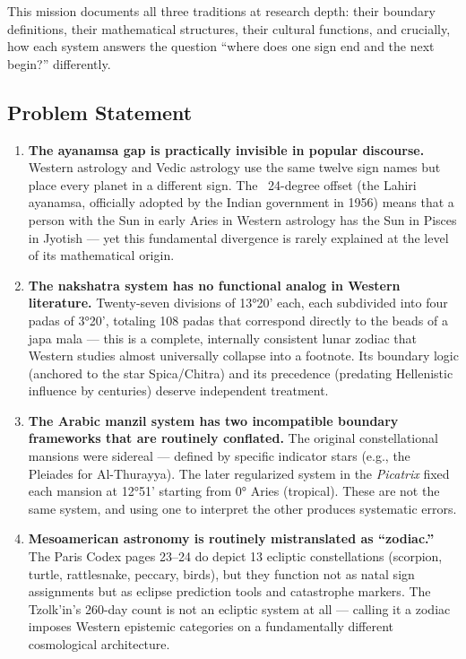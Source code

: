 \documentclass[11pt,letterpaper]{article}
\begin{document}
This mission documents all three traditions at research depth: their boundary definitions, their mathematical structures, their cultural functions, and crucially, how each system answers the question ``where does one sign end and the next begin?'' differently.

\subsection{Problem Statement}

\begin{enumerate}
  \item \textbf{The ayanamsa gap is practically invisible in popular discourse.} Western astrology and Vedic astrology use the same twelve sign names but place every planet in a different sign. The ~24-degree offset (the Lahiri ayanamsa, officially adopted by the Indian government in 1956) means that a person with the Sun in early Aries in Western astrology has the Sun in Pisces in Jyotish --- yet this fundamental divergence is rarely explained at the level of its mathematical origin.

  \item \textbf{The nakshatra system has no functional analog in Western literature.} Twenty-seven divisions of 13°20' each, each subdivided into four padas of 3°20', totaling 108 padas that correspond directly to the beads of a japa mala --- this is a complete, internally consistent lunar zodiac that Western studies almost universally collapse into a footnote. Its boundary logic (anchored to the star Spica/Chitra) and its precedence (predating Hellenistic influence by centuries) deserve independent treatment.

  \item \textbf{The Arabic manzil system has two incompatible boundary frameworks that are routinely conflated.} The original constellational mansions were sidereal --- defined by specific indicator stars (e.g., the Pleiades for Al-Thurayya). The later regularized system in the \textit{Picatrix} fixed each mansion at 12°51' starting from 0° Aries (tropical). These are not the same system, and using one to interpret the other produces systematic errors.

  \item \textbf{Mesoamerican astronomy is routinely mistranslated as ``zodiac.''} The Paris Codex pages 23--24 do depict 13 ecliptic constellations (scorpion, turtle, rattlesnake, peccary, birds), but they function not as natal sign assignments but as eclipse prediction tools and catastrophe markers. The Tzolk'in's 260-day count is not an ecliptic system at all --- calling it a zodiac imposes Western epistemic categories on a fundamentally different cosmological architecture.


\end{enumerate}
\end{document}
